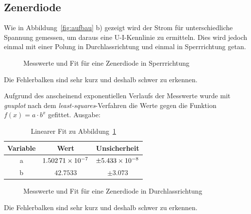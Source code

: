 \subsection{Zenerdiode}
Wie in Abbildung~\ref{fig:aufbau} b) gezeigt wird der Strom für unterschiedliche Spannung gemessen, um daraus eine U-I-Kennlinie zu ermitteln. Dies wird jedoch einmal mit einer Polung in Durchlassrichtung und einmal in Sperrrichtung getan.
\begin{figure}[H]
\centering
{}
\caption{Messwerte und Fit für eine Zenerdiode in Sperrrichtung}
\label{fig:diodesperr}
\end{figure}
Die Fehlerbalken sind sehr kurz und deshalb schwer zu erkennen.

Aufgrund des anscheinend exponentiellen Verlaufs der Messwerte wurde mit \emph{gnuplot} nach dem \emph{least-squares}-Verfahren die Werte gegen die Funktion $f(x)=a\cdot b^x$ gefittet. Ausgabe:
\begin{table}[H]
  \centering
  \begin{tabular}{c | c | c }
    Variable & Wert & Unsicherheit\\ \hline
    a & $\num{1.50271d-7}$ & $\pm\num{5.433d-8}$ \\
    b & $\num{42.7533}$ & $\pm\num{3.073}$
  \end{tabular}
  \caption{Linearer Fit zu Abbildung~\ref{fig:diodesperr}}
  \label{tab:fitdiodesperr}
\end{table}
\begin{figure}[H]
\centering
{}
\caption{Messwerte und Fit für eine Zenerdiode in Durchlassrichtung}
\label{fig:diodedurch}
\end{figure}
Die Fehlerbalken sind sehr kurz und deshalb schwer zu erkennen.

